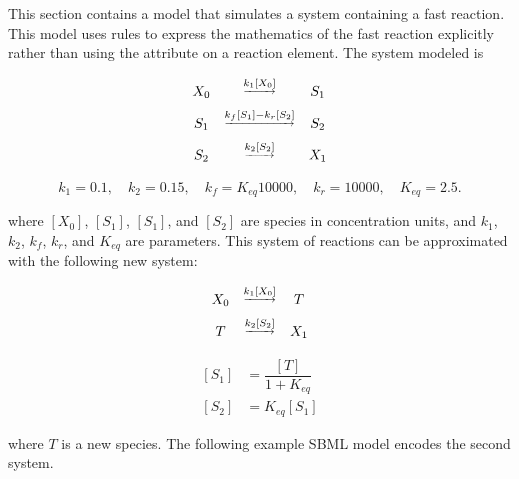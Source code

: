 This section contains a model that simulates a system containing a
fast reaction.  This model uses rules to express the mathematics
of the fast reaction explicitly rather than using the 
attribute on a reaction element.  The system modeled is
\begin{linenomath}
\begin{equation*}
  \begin{array}{@{}ccc@{}}
    X_0 & \overset{\underrightarrow{k_1 [X_0]}}{}           & S_1 \\[6pt]
    S_1 & \overset{\underrightarrow{k_f [S_1] - k_r [S_2]}}{} & S_2 \\[6pt]
    S_2 & \overset{\underrightarrow{k_2 [S_2]}}{}           & X_1 \\[6pt]
  \end{array}
\end{equation*}
\begin{equation*}
    k_1 = 0.1, \quad k_2 = 0.15, \quad k_f = K_{eq} 10000, \quad k_r = 10000, \quad K_{eq} = 2.5.
\end{equation*}
\end{linenomath}
where $[X_0]$, $[S_1]$, $[S_1]$, and $[S_2]$ are species in concentration units,
and $k_1$, $k_2$, $k_f$, $k_r$, and $K_{eq}$ are parameters.  This
system of reactions can be approximated with the following new
system:
\begin{linenomath}
  \begin{equation*}
    \begin{array}{@{}ccc@{}}
      X_0 & \overset{\underrightarrow{k_1 [X_0]}}{} & T \\[6pt]
      T & \overset{\underrightarrow{k_2 [S_2]}}{} & X_1
    \end{array}
  \end{equation*}
  \begin{equation*}
    \begin{aligned}\\[-3ex]
      [S_1] & = \dfrac{[T]}{1 + K_{eq}} \\[6pt]
      [S_2] & = K_{eq} [S_1]
    \end{aligned}
  \end{equation*}
\end{linenomath}

where $T$ is a new species.  The following example SBML model
encodes the second system.



